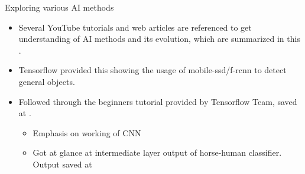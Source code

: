 \documentclass{beamer}
\newcommand{\link}[2]{\href{#1}{\textit{\color{blue}{#2}}}}%
\begin{document}
	\begin{frame}{Exploring various AI methods}
		\begin{itemize}
			\item Several YouTube tutorials and web articles are referenced to get understanding of AI methods and its evolution, which are summarized in this \link{https://docs.google.com/presentation/d/1ugCdqNADQ1QNd91lMP4BmbFBKYhkMoDrN2yIf\_t7SkI/edit?usp=sharing}{google slides}.
			
			\item Tensorflow provided this \link{https://github.com/Project-Dragon-Fly/tutorial-trials/blob/tutorial\_testing/object\_detection\_tensorflow\_tutorial.ipynb}{notebook} showing the usage of mobile-ssd/f-rcnn to detect general objects.
			
			\item Followed through the beginners tutorial provided by Tensorflow Team, saved at \link{https://github.com/Project-Dragon-Fly/tutorial-trials/tree/tutorial\_testing/YouTube\%20Tutorial\%20-\%20TensorFlow}{github}.
			\begin{itemize}
				\item Emphasis on working of CNN
				\item Got at glance at intermediate layer output of horse-human classifier. Output saved at  \link{https://github.com/Project-Dragon-Fly/tutorial-trials/blob/tutorial\_testing/YouTube\%20Tutorial\%20-\%20TensorFlow/Tutorial\%204\%20-\%20CNN\%20on\%20complex\%20images.ipynb}{notebook}
			\end{itemize}
		\end{itemize}
	\end{frame}
\end{document}
